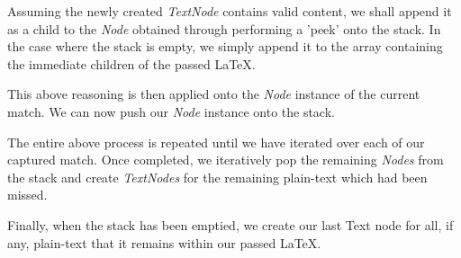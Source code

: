 		Assuming the newly created \textit{TextNode} contains valid content, we shall append it as a child to the \textit{Node} obtained through performing a 'peek' onto the stack. In the case where the stack is empty, we simply append it to the array containing the immediate children of the passed \LaTeX.
		
		This above reasoning is then applied onto the \textit{Node} instance of the current match. We can now push our \textit{Node} instance onto the stack.
		
		The entire above process is repeated until we have iterated over each of our captured match. Once completed, we iteratively pop the remaining \textit{Nodes} from the stack and create \textit{TextNodes} for the remaining plain-text which had been missed.
		
		Finally, when the stack has been emptied, we create our last Text node for all, if any, plain-text that it remains within our passed \LaTeX.